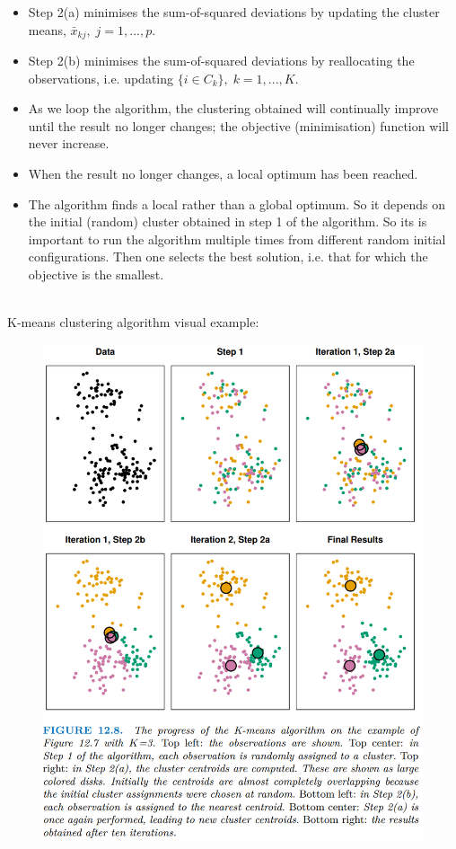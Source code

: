 \documentclass[11pt]{article}
\begin{document}
\begin{itemize}
    \item Step 2(a) minimises the sum-of-squared deviations by updating the cluster means, $\bar{x}_{kj}, \; j=1,...,p$.
    \item Step 2(b) minimises the sum-of-squared deviations by reallocating the observations, i.e. updating $\{i \in C_k\}, \; k=1,...,K$.
    \item As we loop the algorithm, the clustering obtained will continually improve until the result no longer changes; the objective (minimisation) function will never increase.
    \item When the result no longer changes, a local optimum has been reached.
    \item The algorithm finds a local rather than a global optimum. So it depends on the initial (random) cluster obtained in step 1 of the algorithm. So its is important to run the algorithm multiple times from different random initial configurations. Then one selects the best solution, i.e. that for which the objective is the smallest.
\end{itemize} \phantom{i} \\

\noindent K-means clustering algorithm visual example:
\begin{figure}[H]
    \centering
    \includegraphics[width=0.5\linewidth]{K-means clusteing visual example.png}
\end{figure}
\end{document}
